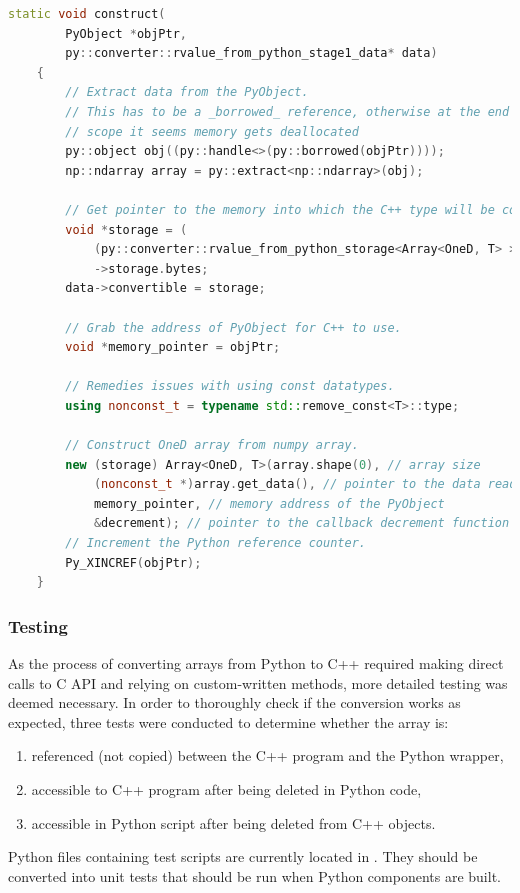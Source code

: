 \begin{lstlisting}[caption={Converter method for converting the Python NumPy arrays into C++ arrays.}, label={lst:python_to_c}, language=C++]
static void construct(
        PyObject *objPtr,
        py::converter::rvalue_from_python_stage1_data* data)
    {
        // Extract data from the PyObject.
        // This has to be a _borrowed_ reference, otherwise at the end of this
        // scope it seems memory gets deallocated
        py::object obj((py::handle<>(py::borrowed(objPtr))));
        np::ndarray array = py::extract<np::ndarray>(obj);
        
        // Get pointer to the memory into which the C++ type will be constructed
        void *storage = (
            (py::converter::rvalue_from_python_storage<Array<OneD, T> >*)data)
            ->storage.bytes;
        data->convertible = storage;
        
        // Grab the address of PyObject for C++ to use.
        void *memory_pointer = objPtr;
        
        // Remedies issues with using const datatypes.
        using nonconst_t = typename std::remove_const<T>::type;
        
        // Construct OneD array from numpy array.        
        new (storage) Array<OneD, T>(array.shape(0), // array size
            (nonconst_t *)array.get_data(), // pointer to the data readable by C++
            memory_pointer, // memory address of the PyObject
            &decrement); // pointer to the callback decrement function
        // Increment the Python reference counter.
        Py_XINCREF(objPtr);
    }
\end{lstlisting}

\subsubsection{Testing}

As the process of converting arrays from Python to C++ required making direct calls to 
C API and relying on custom-written methods, more detailed testing was deemed necessary. 
In order to thoroughly check if the conversion works as expected, three tests were 
conducted to determine whether the array is:

\begin{enumerate}
\item referenced (not copied) between the C++ program and the Python wrapper,
\item accessible to C++ program after being deleted in Python code,
\item accessible in Python script after being deleted from C++ objects.
\end{enumerate}

Python files containing test scripts are currently located in 
. They should be converted into unit tests 
that should be run when Python components are built.
